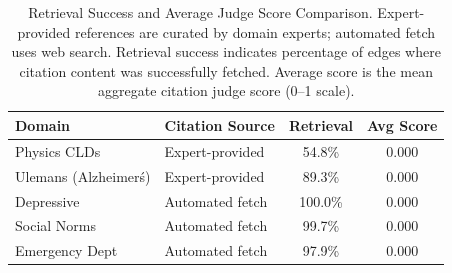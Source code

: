 \begin{table}[H]
\centering
\small
\caption{Retrieval Success and Average Judge Score Comparison. Expert-provided references are curated by domain experts; automated fetch uses web search. Retrieval success indicates percentage of edges where citation content was successfully fetched. Average score is the mean aggregate citation judge score (0--1 scale).}
\label{tab:retrieval-comparison}
\begin{tabular}{llcc}
\toprule
\textbf{Domain} & \textbf{Citation Source} & \textbf{Retrieval} & \textbf{Avg Score} \\
\midrule
Physics CLDs & Expert-provided & 54.8\% & 0.000 \\
Ulemans (Alzheimer\'s) & Expert-provided & 89.3\% & 0.000 \\
Depressive & Automated fetch & 100.0\% & 0.000 \\
Social Norms & Automated fetch & 99.7\% & 0.000 \\
Emergency Dept & Automated fetch & 97.9\% & 0.000 \\
\bottomrule
\end{tabular}
\end{table}
